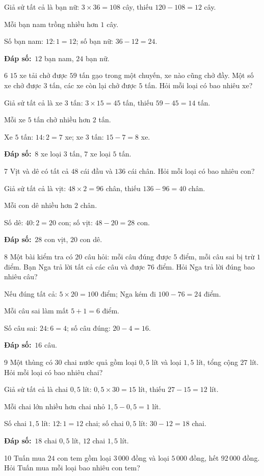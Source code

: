 \documentclass[11pt]{article}
\newif\ifsol \solfalse
\providecommand{\AnsWord}{Đáp số}
\newcommand{\dapso}[1]{\par\textbf{\AnsWord:}\ #1}
\newcommand{\probsol}[1]{%
  \begin{lrbox}{\solmeasure}\begin{minipage}{\dimexpr\linewidth-24pt\relax}#1\end{minipage}\end{lrbox}%
  \ifsol
    \begin{solbox}#1\end{solbox}%
  \else
    \setlength{\solht}{\dimexpr\ht\solmeasure+\dp\solmeasure+0.85cm\relax}%
    \ifdim\solht<1.35cm\setlength{\solht}{1.35cm}\fi
    \begin{tcolorbox}[colback=white,colframe=Line,boxrule=0.8pt,arc=5pt,
      left=8pt,right=8pt,top=4pt,bottom=4pt,height=\solht]{\footnotesize\color{Slate}\itshape\WorkWord}\end{tcolorbox}%
  \fi}
\newcommand{\gap}{\vspace{0.3cm}}
\def\WorkWord{Bài làm:}
\def\AnsWord{Đáp số}
\begin{document}
\probsol{
Giả sử tất cả là bạn nữ: $3\times36=108$ cây, thiếu $120-108=12$ cây.\par
Mỗi bạn nam trồng nhiều hơn $1$ cây.\par Số bạn nam: $12:1=12$; số bạn nữ: $36-12=24$.
\dapso{$12$ bạn nam, $24$ bạn nữ.}}
\gap
\begin{probbox}{6}{\relax}
$15$ xe tải chở được $59$ tấn gạo trong một chuyến, xe nào cũng chở đầy. Một số xe chở được $3$ tấn, các xe còn lại chở được $5$ tấn. Hỏi mỗi loại có bao nhiêu xe?
\end{probbox}
\probsol{
Giả sử tất cả là xe $3$ tấn: $3\times15=45$ tấn, thiếu $59-45=14$ tấn.\par
Mỗi xe $5$ tấn chở nhiều hơn $2$ tấn.\par Xe $5$ tấn: $14:2=7$ xe; xe $3$ tấn: $15-7=8$ xe.
\dapso{$8$ xe loại $3$ tấn, $7$ xe loại $5$ tấn.}}
\gap
\begin{probbox}{7}{\relax}
Vịt và dê có tất cả $48$ cái đầu và $136$ cái chân. Hỏi mỗi loại có bao nhiêu con?
\end{probbox}
\probsol{
Giả sử tất cả là vịt: $48\times2=96$ chân, thiếu $136-96=40$ chân.\par
Mỗi con dê nhiều hơn $2$ chân.\par Số dê: $40:2=20$ con; số vịt: $48-20=28$ con.
\dapso{$28$ con vịt, $20$ con dê.}}
\gap
\begin{probbox}{8}{\relax}
Một bài kiểm tra có $20$ câu hỏi: mỗi câu đúng được $5$ điểm, mỗi câu sai bị trừ $1$ điểm. Bạn Nga trả lời tất cả các câu và được $76$ điểm. Hỏi Nga trả lời đúng bao nhiêu câu?
\end{probbox}
\probsol{
Nếu đúng tất cả: $5\times20=100$ điểm; Nga kém đi $100-76=24$ điểm.\par
Mỗi câu sai làm mất $5+1=6$ điểm.\par Số câu sai: $24:6=4$; số câu đúng: $20-4=16$.
\dapso{$16$ câu.}}
\gap
\begin{probbox}{9}{\relax}
Một thùng có $30$ chai nước quả gồm loại $0{,}5$ lít và loại $1{,}5$ lít, tổng cộng $27$ lít. Hỏi mỗi loại có bao nhiêu chai?
\end{probbox}
\probsol{
Giả sử tất cả là chai $0{,}5$ lít: $0{,}5\times30=15$ lít, thiếu $27-15=12$ lít.\par
Mỗi chai lớn nhiều hơn chai nhỏ $1{,}5-0{,}5=1$ lít.\par
Số chai $1{,}5$ lít: $12:1=12$ chai; số chai $0{,}5$ lít: $30-12=18$ chai.
\dapso{$18$ chai $0{,}5$ lít, $12$ chai $1{,}5$ lít.}}
\gap
\begin{probbox}{10}{\relax}
Tuấn mua $24$ con tem gồm loại $3\,000$ đồng và loại $5\,000$ đồng, hết $92\,000$ đồng. Hỏi Tuấn mua mỗi loại bao nhiêu con tem?
\end{probbox}
\end{document}
